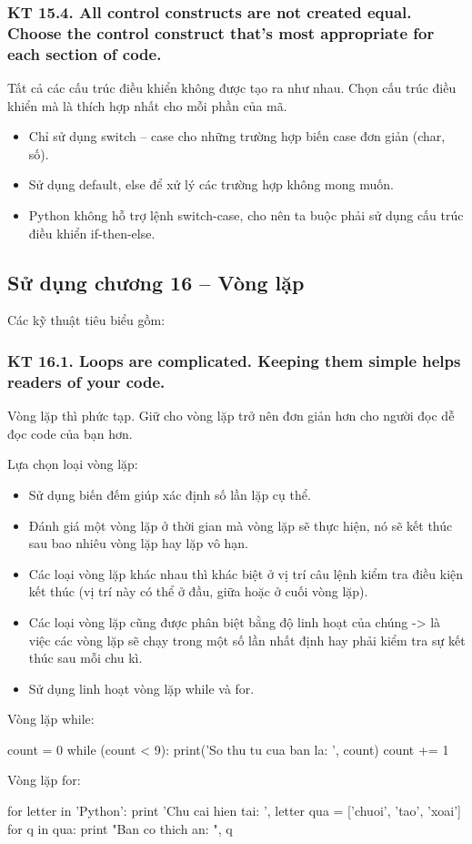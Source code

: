 \documentclass[12pt]{report}
\begin{document}
\subsubsection{KT 15.4. All control constructs are not created equal. Choose the control construct that's most appropriate for each section of code.}
Tất cả các cấu trúc điều khiển không được tạo ra như nhau. Chọn cấu trúc điều khiển mà là thích hợp nhất cho mỗi phần của mã.
\begin{itemize}
	\item Chỉ sử dụng switch – case cho những trường hợp biến case đơn giản (char, số).
	\item Sử dụng default, else để xử lý các trường hợp không mong muốn.
	\item Python không hỗ trợ lệnh switch-case, cho nên ta buộc phải sử dụng cấu trúc điều khiển if-then-else.
\end{itemize}


\subsection{Sử dụng chương 16 – Vòng lặp}
\noindent Các kỹ thuật tiêu biểu gồm: 

\subsubsection{KT 16.1. Loops are complicated. Keeping them simple helps readers of your code.}
Vòng lặp thì phức tạp. Giữ cho vòng lặp trở nên đơn giản hơn cho người đọc dễ đọc code của bạn hơn.
\vspace*{3mm}

Lựa chọn loại vòng lặp:
\begin{itemize}
	\item Sử dụng biến đếm giúp xác định số lần lặp cụ thể.
	\item Đánh giá một vòng lặp ở thời gian mà vòng lặp sẽ thực hiện, nó sẽ kết thúc sau bao nhiêu vòng lặp hay lặp vô hạn.
	\item Các loại vòng lặp khác nhau thì khác biệt ở vị trí câu lệnh kiểm tra điều kiện kết thúc (vị trí này có thể ở đầu, giữa hoặc ở cuối vòng lặp).
	\item Các loại vòng lặp cũng được phân biệt bằng độ linh hoạt của chúng -> là việc các vòng lặp sẽ chạy trong một số lần nhất định hay phải kiểm tra sự kết thúc sau mỗi chu kì.
	\item Sử dụng linh hoạt vòng lặp while và for.
\end{itemize}
Vòng lặp while: 
\begin{python}
count = 0
while (count < 9):
	print('So thu tu cua ban la: ', count)
	count += 1
\end{python}
Vòng lặp for:
\begin{python}
for letter in 'Python':
	print 'Chu cai hien tai: ', letter
qua = ['chuoi', 'tao', 'xoai']
for q in qua:
	print "Ban co thich an: ", q
\end{python}
\end{document}
